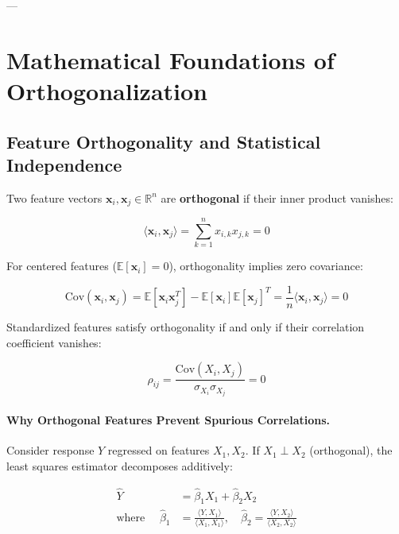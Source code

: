 ---

\section{Mathematical Foundations of Orthogonalization}
\label{sec:math-foundations}

\subsection{Feature Orthogonality and Statistical Independence}

Two feature vectors $\mathbf{x}_i, \mathbf{x}_j \in \mathbb{R}^n$ are \textbf{orthogonal} if their inner product vanishes:

\begin{equation}
\langle \mathbf{x}_i, \mathbf{x}_j \rangle = \sum_{k=1}^{n} x_{i,k} x_{j,k} = 0
\label{eq:orthogonality-def}
\end{equation}

For centered features ($\mathbb{E}[\mathbf{x}_i] = 0$), orthogonality implies zero covariance:

\begin{equation}
\text{Cov}(\mathbf{x}_i, \mathbf{x}_j) = \mathbb{E}[\mathbf{x}_i \mathbf{x}_j^T] - \mathbb{E}[\mathbf{x}_i] \mathbb{E}[\mathbf{x}_j]^T = \frac{1}{n} \langle \mathbf{x}_i, \mathbf{x}_j \rangle = 0
\end{equation}

Standardized features satisfy orthogonality if and only if their correlation coefficient vanishes:

\begin{equation}
\rho_{ij} = \frac{\text{Cov}(X_i, X_j)}{\sigma_{X_i} \sigma_{X_j}} = 0
\label{eq:correlation-def}
\end{equation}

\paragraph{Why Orthogonal Features Prevent Spurious Correlations.}
Consider response $Y$ regressed on features $X_1, X_2$. If $X_1 \perp X_2$ (orthogonal), the least squares estimator decomposes additively:

\begin{equation}
\begin{aligned}
\hat{Y} &= \hat{\beta}_1 X_1 + \hat{\beta}_2 X_2 \\
\text{where } \quad \hat{\beta}_1 &= \frac{\langle Y, X_1 \rangle}{\langle X_1, X_1 \rangle}, \quad \hat{\beta}_2 = \frac{\langle Y, X_2 \rangle}{\langle X_2, X_2 \rangle}
\end{aligned}
\label{eq:orthogonal-regression}
\end{equation}

